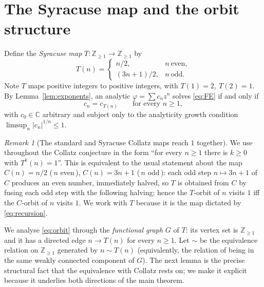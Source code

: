 \documentclass{amsart}
\theoremstyle{remark}
\newtheorem{remark}{Remark}
\begin{document}
\section{The Syracuse map and the orbit structure}

Define the \emph{Syracuse map} $T:\mathbb{Z}_{\ge1}\to\mathbb{Z}_{\ge1}$ by
\[
T(n)=
\begin{cases}
n/2, & n\ \text{even},\\
(3n+1)/2, & n\ \text{odd}.
\end{cases}
\]
Note $T$ maps positive integers to positive integers, with $T(1)=2,\ T(2)=1$. By
Lemma~\ref{lem:exponents}, an analytic $\varphi=\sum c_n z^n$ solves \eqref{eq:FE} if and only if
\begin{equation}\label{eq:orbit}
c_n=c_{T(n)}\qquad\text{for every } n\ge1,
\end{equation}
with $c_0\in\mathbb{C}$ arbitrary and subject only to the analyticity growth condition
$\limsup_{n}|c_n|^{1/n}\le1$.

\begin{remark}[The standard and Syracuse Collatz maps reach $1$ together]\label{rem:standardvs}
We use throughout the Collatz conjecture in the form ``for every $n\ge1$ there is $k\ge0$ with
$T^k(n)=1$''. This is equivalent to the usual statement about the map
$C(n)=n/2$ (\,$n$ even\,), $C(n)=3n+1$ (\,$n$ odd\,): each odd step $n\mapsto 3n+1$ of $C$ produces
an even number, immediately halved, so $T$ is obtained from $C$ by fusing each odd step with the
following halving; hence the $T$-orbit of $n$ visits $1$ iff the $C$-orbit of $n$ visits $1$. We work
with $T$ because it is the map dictated by \eqref{eq:recursion}.
\end{remark}

We analyse \eqref{eq:orbit} through the \emph{functional graph} $G$ of $T$: its vertex set is
$\mathbb{Z}_{\ge1}$ and it has a directed edge $n\to T(n)$ for every $n\ge1$. Let $\sim$ be the
equivalence relation on $\mathbb{Z}_{\ge1}$ generated by $n\sim T(n)$ (equivalently, the relation
of being in the same weakly connected component of $G$). The next lemma is the precise structural
fact that the equivalence with Collatz rests on; we make it explicit because it underlies both
directions of the main theorem.
\end{document}
